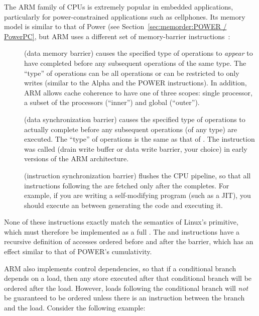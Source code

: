 The ARM family of CPUs is extremely popular in embedded applications,
particularly for power-constrained applications such as cellphones.
Its memory model is similar to that of Power
(see Section~\ref{sec:memorder:POWER / PowerPC}, but ARM uses a
different set of memory-barrier instructions~\cite{ARMv7A:2010}:

\begin{description}
\item	[] (data memory barrier) causes the specified type of
	operations to \emph{appear} to have completed before any
	subsequent operations of the same type.
	The ``type'' of operations can be all operations or can be
	restricted to only writes (similar to the Alpha 
	and the POWER  instructions).
	In addition, ARM allows cache coherence to have one of three
	scopes: single processor, a subset of the processors
	(``inner'') and global (``outer'').
\item	[] (data synchronization barrier) causes the specified
	type of operations to actually complete before any subsequent
	operations (of any type) are executed.
	The ``type'' of operations is the same as that of .
	The  instruction was called  (drain write buffer
	or data write barrier, your choice) in early versions of the
	ARM architecture.
\item	[] (instruction synchronization barrier) flushes the CPU
	pipeline, so that all instructions following the 
	are fetched only after the  completes.
	For example, if you are writing a self-modifying program
	(such as a JIT), you should execute an  between
	generating the code and executing it.
\end{description}

None of these instructions exactly match the semantics of Linux's
 primitive, which must therefore be implemented as a full
.
The  and  instructions have a recursive definition
of accesses ordered before and after the barrier, which has an effect
similar to that of POWER's cumulativity.

ARM also implements control dependencies, so that if a conditional
branch depends on a load, then any store executed after that conditional
branch will be ordered after the load.
However, loads following the conditional branch will \emph{not}
be guaranteed to be ordered unless there is an 
instruction between the branch and the load.
Consider the following example:

